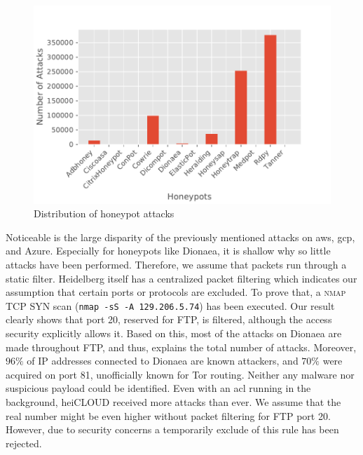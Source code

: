 \begin{figure}[ht]
    \centering
    \includegraphics[width=\textwidth]{figures/tpot-overview-attacks.pdf}
    \caption[Distribution of honeypot attacks]{Distribution of honeypot attacks}
    \label{fig:overview-attacks}
\end{figure}

Noticeable is the large disparity of the previously mentioned attacks on \ac{aws}, \ac{gcp}, and Azure.
Especially for honeypots like Dionaea, it is shallow why so little attacks have been performed.
Therefore, we assume that packets run through a static filter.
Heidelberg itself has a centralized packet filtering which indicates our assumption that certain ports or protocols are excluded.
To prove that, a \textsc{nmap} TCP SYN scan (\verb|nmap -sS -A 129.206.5.74|) has been executed.
Our result clearly shows that port 20, reserved for FTP, is filtered, although the access security explicitly allows it.
Based on this, most of the attacks on Dionaea are made throughout FTP, and thus, explains the total number of attacks.
Moreover, $96\%$ of IP addresses connected to Dionaea are known attackers, and $70\%$ were acquired on port 81, unofficially known for Tor routing.
Neither any malware nor suspicious payload could be identified.
Even with an \ac{acl} running in the background, heiCLOUD received more attacks than ever.
We assume that the real number might be even higher without packet filtering for FTP port 20.
However, due to security concerns a temporarily exclude of this rule has been rejected.

